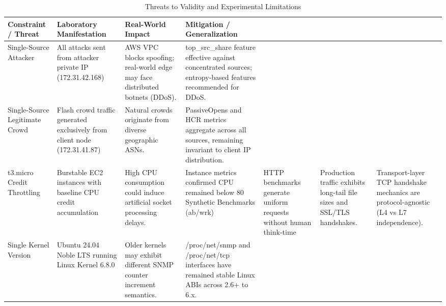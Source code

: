 \begin{table}
\caption{Threats to Validity and Experimental Limitations}
\label{tab:t5}
\begin{tabular}{llll}
\toprule
Constraint / Threat & Laboratory Manifestation & Real-World Impact & Mitigation / Generalization \\
\midrule
Single-Source Attacker & All attacks sent from attacker private IP (172.31.42.168) & AWS VPC blocks spoofing; real-world edge may face distributed botnets (DDoS). & top_src_share feature effective against concentrated sources; entropy-based features recommended for DDoS. \\
Single-Source Legitimate Crowd & Flash crowd traffic generated exclusively from client node (172.31.41.87) & Natural crowds originate from diverse geographic ASNs. & PassiveOpens and HCR metrics aggregate across all sources, remaining invariant to client IP distribution. \\
t3.micro Credit Throttling & Burstable EC2 instances with baseline CPU credit accumulation & High CPU consumption could induce artificial socket processing delays. & Instance metrics confirmed CPU remained below 80%
Synthetic Benchmarks (ab/wrk) & HTTP benchmarks generate uniform requests without human think-time & Production traffic exhibits long-tail file sizes and SSL/TLS handshakes. & Transport-layer TCP handshake mechanics are protocol-agnostic (L4 vs L7 independence). \\
Single Kernel Version & Ubuntu 24.04 Noble LTS running Linux Kernel 6.8.0 & Older kernels may exhibit different SNMP counter increment semantics. & /proc/net/snmp and /proc/net/tcp interfaces have remained stable Linux ABIs across 2.6+ to 6.x. \\
\bottomrule
\end{tabular}
\end{table}
